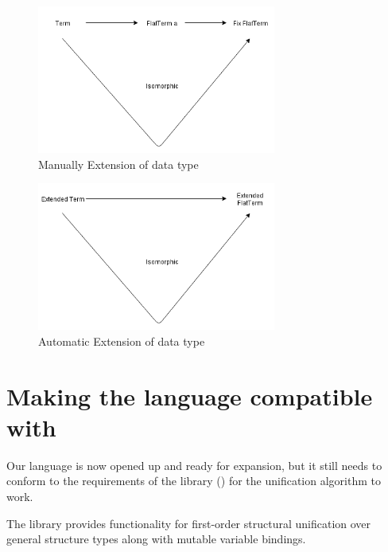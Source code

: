 \documentclass[thesis-solanki.tex]{subfiles}
\begin{document}
\begin{figure}[H]
  \centering
  \includegraphics[scale=0.1, width=0.7\textwidth]{extended_data_type_1.png}
  \caption{Manually Extension of data type}
  \label{fig:manual-extension}
\end{figure}

\begin{figure}[H]
  \centering
  \includegraphics[width=0.7\textwidth, scale=0.1]{extended_data_type_2.png}
  \caption{Automatic Extension of data type}
  \label{fig:automatic-extension}
\end{figure}


\section[Making the language compatible with \protect\codeLibrary{unification-fd}]{Making the language compatible with \newline{}}\label{sec:making-lang-comp}

Our language is now opened up and ready for expansion, but it still needs to conform to the requirements of the
 library (\cite{unification-fd-lib}) for the unification algorithm to work.

The library provides functionality for first-order structural unification over general structure types along with
mutable variable bindings.
\end{document}
